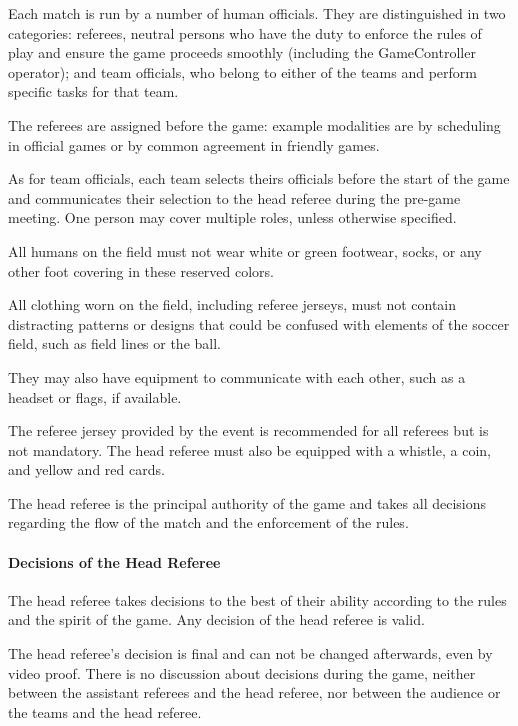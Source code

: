 
\label{sec:referees}

Each match is run by a number of human officials. They are distinguished in two categories: referees, neutral persons who have the duty to enforce the rules of play and ensure the game proceeds smoothly (including the GameController operator); and team officials, who belong to either of the teams and perform specific tasks for that team.

The referees are assigned before the game: example modalities are by scheduling in official games or by common agreement in friendly games.

As for team officials, each team selects theirs officials before the start of the game and communicates their selection to the head referee during the pre-game meeting. One person may cover multiple roles, unless otherwise specified.


All humans on the field must not wear white or green footwear, socks, or any other foot covering in these reserved colors.

All clothing worn on the field, including referee jerseys, must not contain distracting patterns or designs that could be confused with elements of the soccer field, such as field lines or the ball.

They may also have equipment to communicate with each other, such as a headset or flags, if available.

The referee jersey provided by the event is recommended for all referees but is not mandatory.
The head referee must also be equipped with a whistle, a coin, and yellow and red cards.

\label{sec:head_referee}

The head referee is the principal authority of the game and takes all decisions regarding the flow of the match and the enforcement of the rules.

\paragraph{Decisions of the Head Referee}
The head referee takes decisions to the best of their ability according to the rules and the spirit of the game. Any decision of the head referee is valid.

The head referee's decision is final and can not be changed afterwards, even by video proof. There is no discussion about decisions during the game, neither between the assistant referees and the head referee, nor between the audience or the teams and the head referee.

